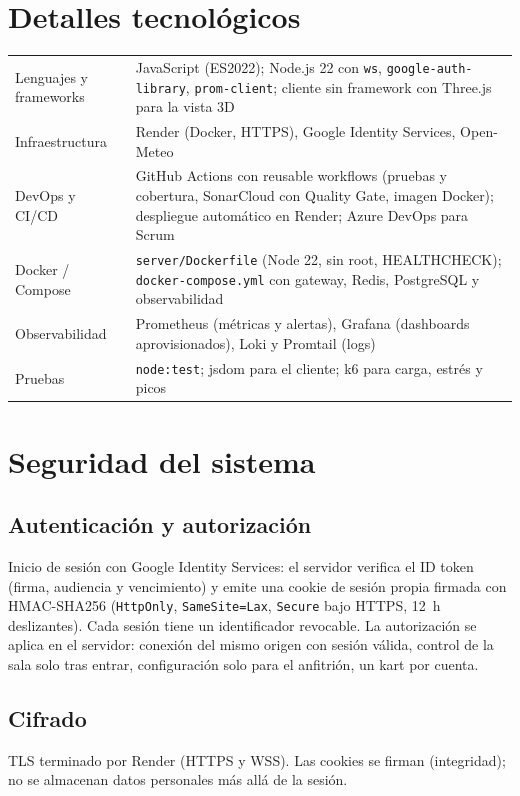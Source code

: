 \documentclass[11pt,a4paper]{article}
\begin{document}
\section{Detalles tecnológicos}
\begin{tabularx}{\textwidth}{lL}
\toprule
Lenguajes y frameworks & JavaScript (ES2022); Node.js 22 con \texttt{ws}, \texttt{google-auth-library}, \texttt{prom-client}; cliente sin framework con Three.js para la vista 3D\\
Infraestructura & Render (Docker, HTTPS), Google Identity Services, Open-Meteo\\
DevOps y CI/CD & GitHub Actions con reusable workflows (pruebas y cobertura, SonarCloud con Quality Gate, imagen Docker); despliegue automático en Render; Azure DevOps para Scrum\\
Docker / Compose & \texttt{server/Dockerfile} (Node 22, sin root, HEALTHCHECK); \texttt{docker-compose.yml} con gateway, Redis, PostgreSQL y observabilidad\\
Observabilidad & Prometheus (métricas y alertas), Grafana (dashboards aprovisionados), Loki y Promtail (logs)\\
Pruebas & \texttt{node:test}; jsdom para el cliente; k6 para carga, estrés y picos\\
\bottomrule
\end{tabularx}

\section{Seguridad del sistema}
\subsection{Autenticación y autorización}
Inicio de sesión con Google Identity Services: el servidor verifica el ID
token (firma, audiencia y vencimiento) y emite una cookie de sesión propia
firmada con HMAC-SHA256 (\texttt{HttpOnly}, \texttt{SameSite=Lax},
\texttt{Secure} bajo HTTPS, 12~h deslizantes). Cada sesión tiene un
identificador revocable. La autorización se aplica en el servidor: conexión
del mismo origen con sesión válida, control de la sala solo tras entrar,
configuración solo para el anfitrión, un kart por cuenta.

\subsection{Cifrado}
TLS terminado por Render (HTTPS y WSS). Las cookies se firman (integridad);
no se almacenan datos personales más allá de la sesión.
\end{document}
